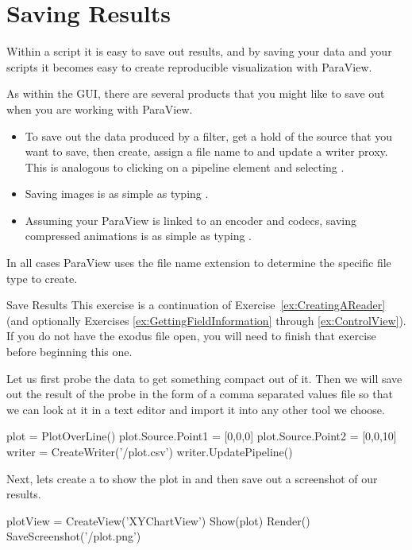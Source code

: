 \section{Saving Results}
\label{sec:Saving}

Within a script it is easy to save out results, and by saving your data and
your scripts it becomes easy to create reproducible visualization with
ParaView.

As within the GUI, there are several products that you might like to save out when you are working with ParaView.
\begin{itemize}
\item To save out the data produced by a filter, get a hold of the source
  that you want to save, then create, assign a file name to and update a
  writer proxy.  This is analogous to clicking on a pipeline element and
  selecting .
\item Saving images is as simple as typing
  .
\item Assuming your ParaView is linked to an encoder and codecs, saving
  compressed animations is as simple as typing
  .
\end{itemize}
In all cases ParaView uses the file name extension to determine the
specific file type to create.

\begin{exercise}{Save Results}
  \label{ex:SaveResults}%
  This exercise is a continuation of Exercise~\ref{ex:CreatingAReader} (and
  optionally Exercises \ref{ex:GettingFieldInformation} through
  \ref{ex:ControlView}). If you do not have the exodus file open, you will
  need to finish that exercise before beginning this one.

  Let us first probe the data to get something compact out of it. Then we will save out the result of the probe in the form of a comma separated values file so that we can look at it in a text editor and import it into any other tool we choose.

  \begin{pythonpluscommands}
plot = PlotOverLine()
plot.Source.Point1 = [0,0,0]
plot.Source.Point2 = [0,0,10]
writer = CreateWriter('/plot.csv')
writer.UpdatePipeline()
  \end{pythonpluscommands}

  Next, lets create a  to show the plot in and then save out a screenshot of our results.
  \begin{pythonpluscommands}
plotView = CreateView('XYChartView')
Show(plot)
Render()
SaveScreenshot('/plot.png')
  \end{pythonpluscommands}
\end{exercise}

